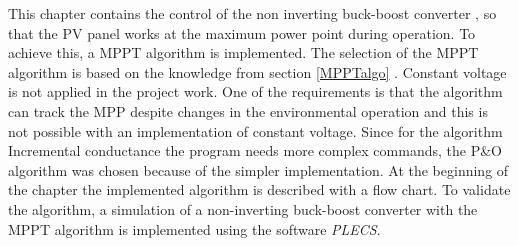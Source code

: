 This chapter contains the control of the non inverting buck-boost converter , so that the PV panel works at the maximum power point during operation. To achieve this, a MPPT algorithm is implemented.
The selection of the MPPT algorithm is based on the knowledge from section  \ref{MPPTalgo} .
Constant voltage is not applied in the project work. One of the requirements is that the algorithm can track the MPP despite changes in the environmental operation and this is not possible with an implementation of constant voltage. Since for the algorithm Incremental conductance the program needs more complex commands, the P\&O algorithm was chosen because of the simpler implementation. %
At the beginning of the chapter the implemented algorithm is described with a flow chart. To validate the algorithm, a simulation of a non-inverting buck-boost converter with the MPPT algorithm is implemented using the software \textit{PLECS}. 
